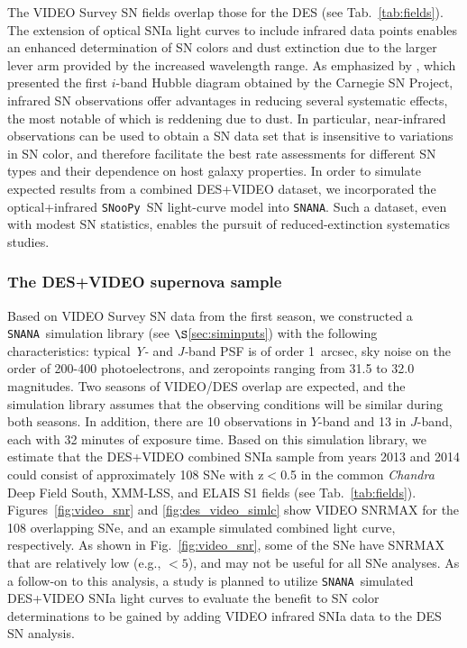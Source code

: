 \documentclass[preprint2]{aastex}    %
\newcommand{\snoop}{{\tt SNooPy}}
\newcommand{\snana}{{\tt SNANA}}
\begin{document}
The VIDEO Survey SN fields overlap those for the DES (see Tab.~\ref{tab:fields}). 
The extension of optical SNIa light curves to include infrared data points enables
an enhanced determination of SN colors and dust extinction 
due to the larger lever arm provided
by the increased wavelength range. 
As emphasized by \cite{fre09}, which presented the first
$i$-band Hubble diagram obtained by the Carnegie SN Project,
infrared SN observations offer advantages in reducing several systematic
effects, the most notable of which is reddening due to dust. In
particular, near-infrared observations can be used to obtain a SN data set
that is insensitive to variations in SN color, and therefore
facilitate the best rate assessments for different SN types and their
dependence on host galaxy properties. In order to simulate expected
results from a combined DES+VIDEO dataset, we incorporated
the optical+infrared \snoop\ SN light-curve model \citep{bur11} into
\snana. Such a dataset, even with modest SN statistics, enables the pursuit of
reduced-extinction systematics studies. 

\subsubsection{The DES+VIDEO supernova sample}\label{sec:sample}
Based on VIDEO Survey SN data from the first season, we constructed a \snana\ simulation
library (see $\S$\ref{sec:siminputs}) with the following
characteristics: typical \emph{Y-} and  \emph{J-}band PSF 
is of order 1~arcsec, sky noise on the order of 200-400 photoelectrons, and 
zeropoints ranging from 31.5 to 32.0 magnitudes. 
Two seasons of VIDEO/DES overlap are expected, and the simulation library assumes that
the observing conditions will be similar during both seasons. 
In addition, there are 10 observations in $Y$-band and 13 in $J$-band, each with
32 minutes of exposure time. 
Based on this simulation library, we estimate
that the DES+VIDEO combined SNIa sample from years 2013 and 2014 could
consist of approximately 108 SNe with z$<$0.5 in the common
\textit{Chandra} Deep Field South, XMM-LSS, and ELAIS S1 fields (see
Tab.~\ref{tab:fields}). Figures~\ref{fig:video_snr} and
\ref{fig:des_video_simlc} show VIDEO SNRMAX for the 108 overlapping 
SNe, and an example 
simulated combined light curve, respectively. As shown in 
Fig.~\ref{fig:video_snr}, some of the SNe have SNRMAX 
that are relatively low (e.g., $<5$), and may not be useful for
all SNe analyses. As a follow-on to this analysis, a study is planned to
utilize \snana\ simulated DES+VIDEO SNIa light curves to
evaluate the benefit to SN color determinations to be gained by adding
VIDEO infrared SNIa data to the DES SN analysis. 
\end{document}
